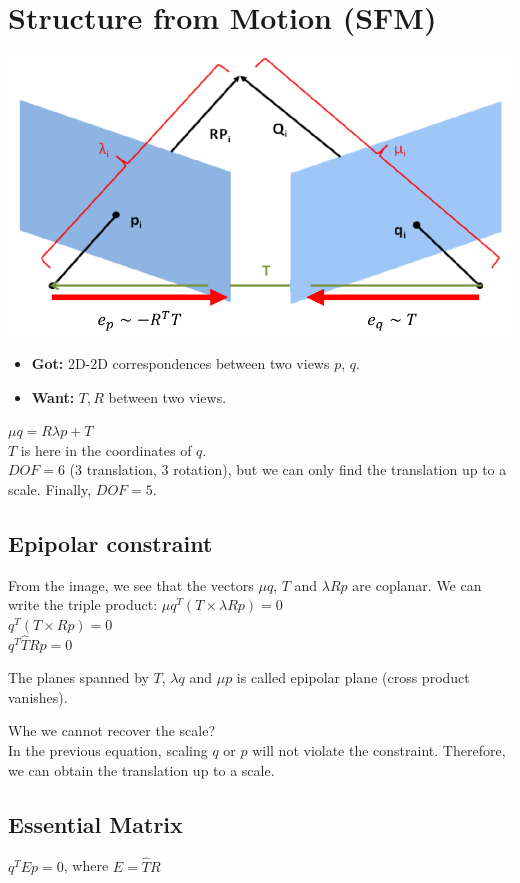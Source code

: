 \section{Structure from Motion (SFM)}
\includegraphics[width=\linewidth]{Images/SFM.png}
\begin{itemize}
  \item \textbf{Got:} 2D-2D correspondences between two views $p$, $q$.
  \item \textbf{Want:} $T, R$ between two views.
\end{itemize}
$\mu q = R \lambda p + T$\\
$T$ is here in the coordinates of $q$.\\
$DOF = 6$ (3 translation, 3 rotation), but 
we can only find the translation up to a scale. Finally, $DOF = 5$.

\subsection*{Epipolar constraint}
From the image, we see that the vectors $\mu q$, $T$ and $\lambda R p$
are coplanar. We can write the triple product:
$\mu q^T ( T \times \lambda R p) = 0$\\
$q^T ( T \times R p) = 0$\\
$q^T \hat{T} R p = 0$

The planes spanned by $T$, $\lambda q$ and $\mu p$ is called epipolar
plane (cross product vanishes).

\alert{Whe we cannot recover the scale?}\\
In the previous equation, scaling $q$ or $p$ will not violate the
constraint. Therefore, we can obtain the translation up to a scale.

\subsection*{Essential Matrix}
$q^T E p = 0$, where $E = \hat{T} R$

